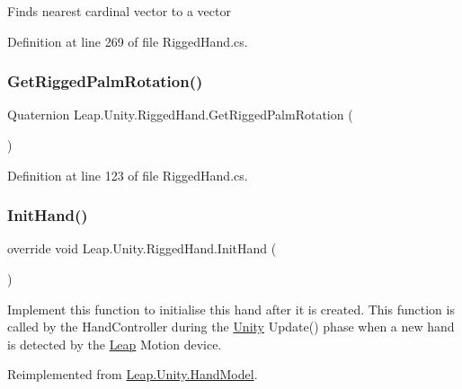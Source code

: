 Finds nearest cardinal vector to a vector 

Definition at line 269 of file Rigged\+Hand.\+cs.

\mbox{\label{class_leap_1_1_unity_1_1_rigged_hand_aeeb6a629e804a4047ff01562cde17371}} 
\subsubsection{\texorpdfstring{GetRiggedPalmRotation()}{GetRiggedPalmRotation()}}
{\footnotesize\ttfamily Quaternion Leap.\+Unity.\+Rigged\+Hand.\+Get\+Rigged\+Palm\+Rotation (\begin{DoxyParamCaption}{ }\end{DoxyParamCaption})}



Definition at line 123 of file Rigged\+Hand.\+cs.

\mbox{\label{class_leap_1_1_unity_1_1_rigged_hand_a588b2f58a5ffbbfc451ddf8432228507}} 
\subsubsection{\texorpdfstring{InitHand()}{InitHand()}}
{\footnotesize\ttfamily override void Leap.\+Unity.\+Rigged\+Hand.\+Init\+Hand (\begin{DoxyParamCaption}{ }\end{DoxyParamCaption})\hspace{0.3cm}{\ttfamily [virtual]}}

Implement this function to initialise this hand after it is created. This function is called by the Hand\+Controller during the \mbox{\hyperlink{namespace_leap_1_1_unity}{Unity}} Update() phase when a new hand is detected by the \mbox{\hyperlink{namespace_leap_1_1_unity_1_1_leap}{Leap}} Motion device. 

Reimplemented from \mbox{\hyperlink{class_leap_1_1_unity_1_1_hand_model_a67f1a6887e0803c96095a376fc1e6031}{Leap.\+Unity.\+Hand\+Model}}.



